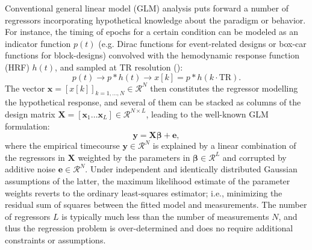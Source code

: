 Conventional general linear model (GLM) analysis puts forward a number of regressors incorporating hypothetical knowledge about the paradigm or behavior. For instance, the timing of epochs for a certain condition can be modeled as an indicator function $p(t)$ (e.g. Dirac functions for event-related designs or box-car functions for block-designs) convolved with the hemodynamic response function (HRF) $h(t)$, and sampled at TR resolution (\citealt{Friston1994AnalysisfunctionalMRI,Friston1998EventRelatedfMRI,Boynton1996LinearSystemsAnalysis,Cohen1997ParametricAnalysisfMRI}):
$$
   p(t) \rightarrow p*h(t) \rightarrow x[k] = p*h(k\cdot\text{TR}).
$$
The vector $\mathbf{x}=[x[k]]_{k=1,\ldots,N}  \in \mathcal{R}^{N}$ then constitutes the regressor modelling the hypothetical response, and several of them can be stacked as columns of the design matrix $\mathbf{X}=[\mathbf{x}_1 \ldots \mathbf{x}_L] \in \mathcal{R}^{N \times L}$, leading to the well-known GLM formulation: 
\begin{equation}
    \label{eq:glm}
    \mathbf{y} = \mathbf{X} \boldsymbol\beta + \mathbf{e},
\end{equation}
where the empirical timecourse $\mathbf{y} \in \mathcal{R}^{N}$ is explained by a linear combination of the regressors in $\mathbf{X}$ weighted by the parameters in $\boldsymbol\beta \in \mathcal{R}^{L}$ and corrupted by additive noise $\mathbf{e}\in \mathcal{R}^{N}$. Under independent and identically distributed Gaussian assumptions of the latter, the maximum likelihood estimate of the parameter weights reverts to the ordinary least-squares estimator; i.e., minimizing the residual sum of squares between the fitted model and measurements. The number of regressors $L$ is typically much less than the number of measurements $N$, and thus the regression problem is over-determined and does no require additional constraints or assumptions.


